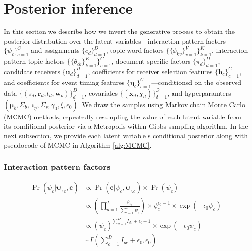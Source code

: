 \documentclass[ba]{imsart}
\numberwithin{equation}{section}
\theoremstyle{plain}
\begin{document}
	\section{Posterior inference}\label{sec:inference}
	In this section we describe how we invert the generative process to obtain the posterior distribution over the latent variables---interaction pattern factors $\{\psi_c\}_{c=1}^C$ and assignments $\{c_d\}_{d=1}^D$, topic-word factors $\{\{\phi_{kv}\}_{v=1}^V\}_{k=1}^K$, interaction pattern-topic factors $\{\{\theta_{ck}\}_{k=1}^K\}_{c=1}^C$, document-specific factors $\{\pi_{d}\}_{d=1}^D$, candidate receivers $\{\boldsymbol{u}_d\}_{d=1}^D$, coefficients for receiver selection features $\{\boldsymbol{b}_c\}_{c=1}^C$, and coefficients for event timing features $\{\boldsymbol{\eta}_c\}_{c=1}^C$---conditioned on the observed data $\{(s_d, \boldsymbol{r}_d, t_d, \boldsymbol{w}_d)\}_{d=1}^D$, covariates $\{(\boldsymbol{x}_d, \boldsymbol{y}_d)\}_{d=1}^D$, and hyperparamters $(\boldsymbol{\mu}_b, \Sigma_b, \boldsymbol{\mu}_\eta, \Sigma_\eta, \gamma_0, \xi, \epsilon_0)$. We draw the samples using Markov chain Monte Carlo (MCMC) methods, repeatedly resampling the value of each latent variable from its conditional posterior via a Metropolis-within-Gibbs sampling algorithm. In the next subsection, we provide each latent variable's conditional posterior along with pseudocode of MCMC in Algorithm \ref{alg:MCMC}.
		\subsubsection{Interaction pattern factors}
		\begin{equation}
		\begin{aligned}
	\Pr(\psi_c|\boldsymbol{\psi}_{\backslash c}, \boldsymbol{c}) & \propto \Pr(\boldsymbol{c}|\psi_c, \boldsymbol{\psi}_{\backslash c}) \times \Pr(\psi_c)\\
	& \propto (\prod_{d=1}^D \frac{\psi_{c_d}}{\sum_{c=1}^C\psi_c} )\times \psi_c^{\epsilon_0-1} \times \exp(-\epsilon_0 \psi_c)\\
	&\propto (\psi_c)^{\sum_{d=1}^D I_{dc}+\epsilon_0-1}\times \exp(-\epsilon_0 \psi_c)\\
&	\sim \Gamma(\sum_{d=1}^D I_{dc}+\epsilon_0, \epsilon_0)
		\end{aligned}	
		\end{equation}
\end{document}
